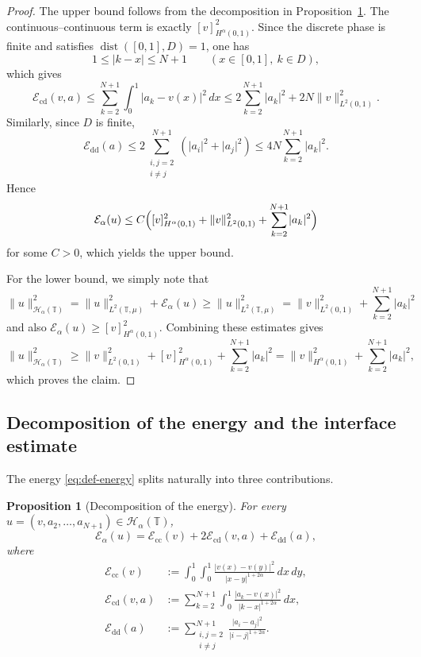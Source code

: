 \documentclass[11pt]{article}
\numberwithin{equation}{section}
\newtheorem{proposition}[theorem]{Proposition}
\theoremstyle{definition}
\newcommand{\T}{\mathbb{T}}
\newcommand{\EE}{\mathcal{E}}
\newcommand{\HH}{\mathcal{H}}
\newcommand{\abs}[1]{\lvert#1\rvert}
\newcommand{\norm}[1]{\lVert#1\rVert}
\newcommand{\cc}{\mathrm{cc}}
\newcommand{\cdt}{\mathrm{cd}}
\newcommand{\dd}{\mathrm{dd}}
\begin{document}
\begin{proof}
The upper bound follows from the decomposition in Proposition~\ref{prop:decomposition}. The continuous--continuous term is exactly $[v]_{H^\alpha(0,1)}^2$. Since the discrete phase is finite and satisfies $\operatorname{dist}([0,1],D)=1$, one has
\[
1\le \abs{k-x}\le N+1\qquad (x\in[0,1],\ k\in D),
\]
which gives
\[
\EE_{\cdt}(v,a)
\le \sum_{k=2}^{N+1}\int_0^1 \abs{a_k-v(x)}^2\,dx
\le 2\sum_{k=2}^{N+1}\abs{a_k}^2+2N\norm{v}_{L^2(0,1)}^2.
\]
Similarly, since $D$ is finite,
\[
\EE_{\dd}(a)
\le 2\sum_{\substack{i,j=2\\ i\neq j}}^{N+1}(\abs{a_i}^2+\abs{a_j}^2)
\le 4N\sum_{k=2}^{N+1}\abs{a_k}^2.
\]
Hence
\[
\EE_\alpha(u)\le C\Bigl([v]_{H^\alpha(0,1)}^2+\norm{v}_{L^2(0,1)}^2+\sum_{k=2}^{N+1}\abs{a_k}^2\Bigr)
\]
for some $C>0$, which yields the upper bound.

For the lower bound, we simply note that
\[
\norm{u}_{\HH_\alpha(\T)}^2=\norm{u}_{L^2(\T,\mu)}^2+\EE_\alpha(u)
\ge \norm{u}_{L^2(\T,\mu)}^2
=\norm{v}_{L^2(0,1)}^2+\sum_{k=2}^{N+1}\abs{a_k}^2
\]
and also $\EE_\alpha(u)\ge [v]_{H^\alpha(0,1)}^2$. Combining these estimates gives
\[
\norm{u}_{\HH_\alpha(\T)}^2
\ge \norm{v}_{L^2(0,1)}^2+[v]_{H^\alpha(0,1)}^2+\sum_{k=2}^{N+1}\abs{a_k}^2
=\norm{v}_{H^\alpha(0,1)}^2+\sum_{k=2}^{N+1}\abs{a_k}^2,
\]
which proves the claim.
\end{proof}

\subsection{Decomposition of the energy and the interface estimate}

The energy \eqref{eq:def-energy} splits naturally into three contributions.

\begin{proposition}[Decomposition of the energy]\label{prop:decomposition}
For every $u=(v,a_2,\dots,a_{N+1})\in \HH_\alpha(\T)$,
\begin{equation}\label{eq:energy-decomposition}
\EE_\alpha(u)=\EE_{\cc}(v)+2\EE_{\cdt}(v,a)+\EE_{\dd}(a),
\end{equation}
where
\begin{align}
\EE_{\cc}(v)&:=\int_0^1\int_0^1\frac{\abs{v(x)-v(y)}^2}{\abs{x-y}^{1+2\alpha}}\,dx\,dy,
\label{eq:Ecc}\\
\EE_{\cdt}(v,a)&:=\sum_{k=2}^{N+1}\int_0^1\frac{\abs{a_k-v(x)}^2}{\abs{k-x}^{1+2\alpha}}\,dx,
\label{eq:Ecd}\\
\EE_{\dd}(a)&:=\sum_{\substack{i,j=2\\ i\neq j}}^{N+1}\frac{\abs{a_i-a_j}^2}{\abs{i-j}^{1+2\alpha}}.
\label{eq:Edd}
\end{align}
\end{proposition}
\end{document}
